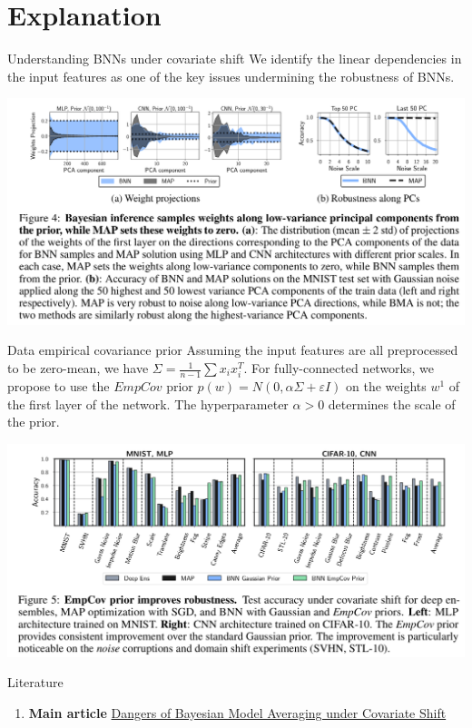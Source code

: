 \documentclass{beamer}
\begin{document}
\section{Explanation}
\begin{frame}{}
    \begin{block}{Understanding BNNs under covariate shift}
        We identify the linear dependencies in the input features as one of the key issues undermining the robustness of BNNs.

    \end{block}
    \includegraphics[scale=0.22]{figure4.png}
\end{frame}


\begin{frame}{}
    \begin{block}{Data empirical covariance prior}
        Assuming the input features are all preprocessed to be zero-mean, we have 
        $\Sigma = \frac 1 {n-1} \sum x_i x_i^T$. For fully-connected
        networks, we propose to use the $EmpCov$ prior $p(w ) = N (0, \alpha \Sigma + \varepsilon I)$ on the weights $w^1$ of the
        first layer of the network. The hyperparameter $\alpha > 0$ determines the scale of the prior.
    \end{block}
    \includegraphics[scale=0.22]{figure5.png}
\end{frame}


\begin{frame}{Literature}
    \begin{enumerate}
        \item \textbf{Main article} \href{https://arxiv.org/pdf/2106.11905.pdf}
        {Dangers of Bayesian Model Averaging under Covariate Shift}
    \end{enumerate}
\end{frame}
\end{document}
